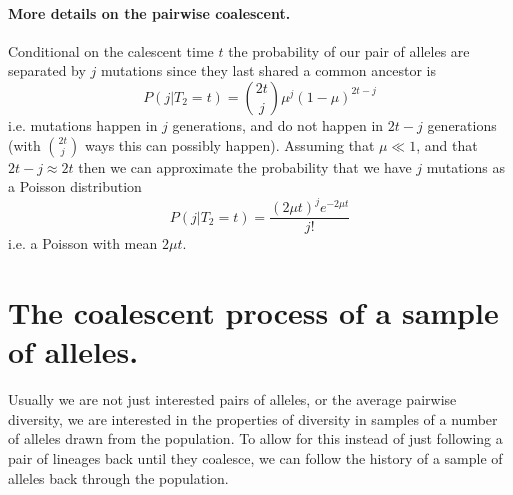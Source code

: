 
\paragraph{More details on the pairwise coalescent.}


Conditional on the calescent time $t$ the probability of our pair of alleles are separated by $j$ mutations
since they last shared a common ancestor is
\begin{equation}
P(j | T_2 = t ) = {2t \choose j} \mu^{j} (1-\mu)^{2t-j}
\end{equation}
i.e. mutations happen in $j$ generations, and do not happen in $2t-j$
generations (with ${2t \choose j}$ ways this can possibly
happen). Assuming that $\mu \ll 1$, and that $2t-j \approx 2t$ then we
can approximate the probability that we have $j$ mutations as a
Poisson distribution
\begin{equation}
P(j | T_2 = t ) = \frac{ (2 \mu t )^{j} e^{-2\mu t}}{j!}
\end{equation}
i.e. a Poisson with mean $2\mu t $. \\


\section{The coalescent process of a sample of alleles.}

Usually we are not just interested pairs of alleles, or the
average pairwise diversity, we are interested in the properties of
diversity in samples of a number of alleles drawn from the population.  
To allow for this instead of just following a pair of lineages back until they
coalesce, we can follow the history of a sample of alleles back
through the population.

